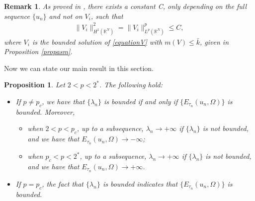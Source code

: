 \documentclass[10pt,a4paper]{article}
\newtheorem{proposition}[theorem]{Proposition}
\newtheorem{remark}[theorem]{Remark}
\theoremstyle{definition} \theoremstyle{remark}
\numberwithin{equation}{section}
\newcommand{\R}{\mathbb{R}}
\newcommand{\la}{\lambda}
\begin{document}
\begin{remark}
	As proved in \cite[Lemma 2.13]{PV}, there exists a constant C, only depending on the full sequence $\{u_n\}$ and not on $V_i$, such that
	\begin{align*}
		\|V_i\|_{H^1(\R^N)}^2 = \|V_i\|_{L^p(\R^N)}^p \le C,
	\end{align*}
    where $V_i$ is the bounded solution of \eqref{equationV} with $m(V) \leq \bar k$, given in Proposition \ref{propasm}.
\end{remark}

Now we can state our main result in this section.

\begin{proposition} \label{proprelationship}
	Let $2 < p < 2^*$. The following hold:
	\begin{itemize}
		\item[(1)] If $p \neq p_c$, we have that $\{\la_n\}$ is bounded if and only if $\{E_{\tau_n}(u_n,\Omega)\}$ is bounded. Moreover,
		\begin{itemize}
			\item when $2 < p < p_c$, up to a subsequence, $\la_n \to +\infty$ if $\{\la_n\}$ is not bounded, and we have that $E_{\tau_n}(u_n,\Omega) \to -\infty$;
			\item when $p_c < p < 2^*$, up to a subsequence, $\la_n \to +\infty$ if $\{\la_n\}$ is not bounded, and we have that $E_{\tau_n}(u_n,\Omega) \to +\infty$.
		\end{itemize}
		\item[(2)] If $p = p_c$, the fact that $\{\la_n\}$ is bounded indicates that $\{E_{\tau_n}(u_n,\Omega)\}$ is bounded.
	\end{itemize}
	
\end{proposition}
\end{document}
